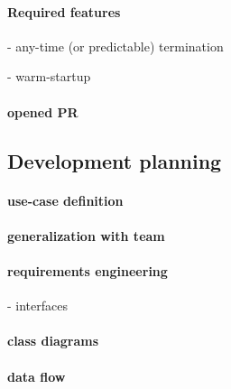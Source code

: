 \paragraph{Required features}
- any-time (or predictable) termination

- warm-startup

\paragraph{opened PR}


\subsection{Development planning}
\paragraph{use-case definition}
\paragraph{generalization with team}
\paragraph{requirements engineering}
- interfaces
\paragraph{class diagrams}
\paragraph{data flow}